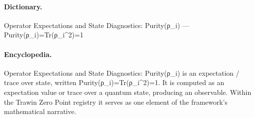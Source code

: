 \paragraph{Dictionary.}
Operator Expectations and State Diagnostics: Purity(ρ\_i) — Purity(ρ\_i)=Tr(ρ\_i\textasciicircum{}2)=1

\paragraph{Encyclopedia.}
Operator Expectations and State Diagnostics: Purity(ρ\_i) is an expectation / trace over state, written Purity(ρ\_i)=Tr(ρ\_i\textasciicircum{}2)=1. It is computed as an expectation value or trace over a quantum state, producing an observable. Within the Trawin Zero Point registry it serves as one element of the framework's mathematical narrative.

